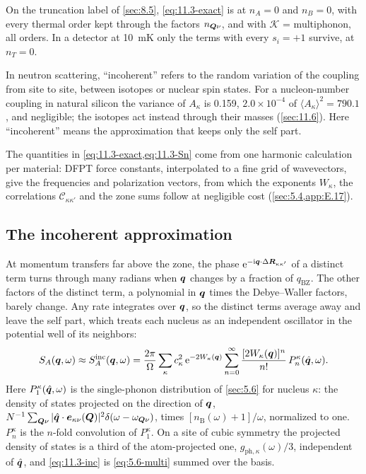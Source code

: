 On the truncation label of \cref{sec:8.5}, \cref{eq:11.3-exact} is at $n_A = 0$ and $n_B = 0$, with every thermal order kept through the factors $n_{\bm{Q}\nu}$, and with $\mathcal{K}$ = multiphonon, all orders. In a detector at \SI{10}{mK} only the terms with every $s_i = +1$ survive, at $n_T = 0$.

In neutron scattering, ``incoherent'' refers to the random variation of the coupling from site to site, between isotopes or nuclear spin states. For a nucleon-number coupling in natural silicon the variance of $A_\kappa$ is 0.159, $2.0\times10^{-4}$ of $\langle A_\kappa\rangle^2 = 790.1$, and negligible; the isotopes act instead through their masses (\cref{sec:11.6}). Here ``incoherent'' means the approximation that keeps only the self part.

The quantities in \cref{eq:11.3-exact,eq:11.3-Sn} come from one harmonic calculation per material: DFPT force constants, interpolated to a fine grid of wavevectors, give the frequencies and polarization vectors, from which the exponents $W_\kappa$, the correlations $\mathcal{C}_{\kappa\kappa'}$ and the zone sums follow at negligible cost (\cref{sec:5.4,app:E.17}).

\subsection{The incoherent approximation}

At momentum transfers far above the zone, the phase $\mathrm{e}^{-\mathrm{i}\bm{q}\cdot\Delta\bm{R}_{\kappa\kappa'}}$ of a distinct term turns through many radians when $\bm{q}$ changes by a fraction of $q_{\mathrm{BZ}}$. The other factors of the distinct term, a polynomial in $\bm{q}$ times the Debye--Waller factors, barely change. Any rate integrates over $\bm{q}$, so the distinct terms average away and leave the self part, which treats each nucleus as an independent oscillator in the potential well of its neighbors:
\begin{equation}
  S_A(\bm{q},\omega) \approx S^{\mathrm{inc}}_A(\bm{q},\omega) = \frac{2\pi}{\Omega}\sum_\kappa c_\kappa^2\,\mathrm{e}^{-2W_\kappa(\bm{q})}\sum_{n=0}^{\infty}\frac{[2W_\kappa(\bm{q})]^n}{n!}\,P^\kappa_n(\hat{\bm{q}},\omega) .
  \label{eq:11.3-inc}
\end{equation}
Here $P^\kappa_1(\hat{\bm{q}},\omega)$ is the single-phonon distribution of \cref{sec:5.6} for nucleus $\kappa$: the density of states projected on the direction of $\bm{q}$, $N^{-1}\sum_{\bm{Q}\nu}|\hat{\bm{q}}\cdot\bm{e}_{\kappa\nu}(\bm{Q})|^2\delta(\omega - \omega_{\bm{Q}\nu})$, times $[n_{\mathrm{B}}(\omega) + 1]/\omega$, normalized to one. $P^\kappa_n$ is the $n$-fold convolution of $P^\kappa_1$. On a site of cubic symmetry the projected density of states is a third of the atom-projected one, $g_{\mathrm{ph},\kappa}(\omega)/3$, independent of $\hat{\bm{q}}$, and \cref{eq:11.3-inc} is \cref{eq:5.6-multi} summed over the basis.

